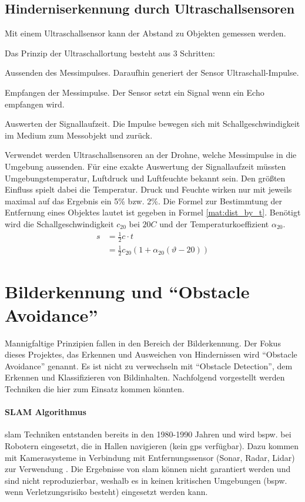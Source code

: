 \subsection{Hinderniserkennung durch Ultraschallsensoren}
Mit einem Ultraschallsensor kann der Abstand zu Objekten gemessen werden. 

Das Prinzip der Ultraschallortung besteht aus 3 Schritten:
\begin{compactenum}
	\item Aussenden des Messimpulses. Daraufhin generiert der Sensor Ultraschall-Impulse.
	\item Empfangen der Messimpulse. Der Sensor setzt ein Signal wenn ein Echo empfangen wird.
	\item Auswerten der Signallaufzeit. Die Impulse bewegen sich mit Schallgeschwindigkeit im Medium zum Messobjekt und zurück.
\end{compactenum}

Verwendet werden Ultraschallsensoren an der Drohne, welche Messimpulse in die Umgebung aussenden. Für eine exakte Auswertung der Signallaufzeit müssten Umgebungstemperatur, Luftdruck und Luftfeuchte bekannt sein. Den größten Einfluss spielt dabei die Temperatur. Druck und Feuchte wirken nur mit jeweils maximal auf das Ergebnis ein 5\% bzw. 2\%.\newline
Die Formel zur Bestimmtung der Entfernung eines Objektes lautet ist gegeben in Formel \ref{mat:dist_by_t}. Benötigt wird die Schallgeschwindigkeit $c_{20}$ bei $20 C$ und der Temperaturkoeffizient $\alpha_{20}$\cite[Seite 152]{grudenSensorikUndMesswertverarbeitung2022}.
\begin{align}
	s &=\frac{1}{2}c\cdot t\\
	&=\frac{1}{2}c_{20}(1+\alpha_{20}(\vartheta-20))	\label{mat:dist_by_t}
\end{align}

\section{Bilderkennung und \enquote{Obstacle Avoidance}}
Mannigfaltige Prinzipien fallen in den Bereich der Bilderkennung. Der Fokus dieses Projektes, das Erkennen und Ausweichen von Hindernissen wird \enquote{Obstacle Avoidance} genannt. Es ist nicht zu verwechseln mit \enquote{Obstacle Detection}, dem Erkennen und Klassifizieren von Bildinhalten. Nachfolgend vorgestellt werden Techniken die hier zum Einsatz kommen könnten. 
\paragraph*{SLAM Algorithmus}
\Gls{slam} Techniken entstanden bereits in den 1980-1990 Jahren und wird bspw. bei Robotern eingesetzt, die in Hallen navigieren (kein \gls{gps} verfügbar). Dazu kommen mit Kamerasysteme in Verbindung mit Entfernungssensor (Sonar, Radar, Lidar) zur Verwendung . Die Ergebnisse von \gls{slam} können nicht garantiert werden und sind nicht reproduzierbar, weshalb es in keinen kritischen Umgebungen (bspw. wenn Verletzungsrisiko besteht) eingesetzt werden kann.

